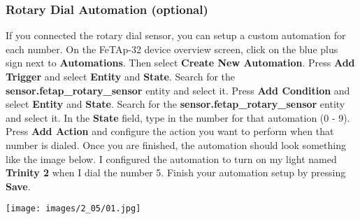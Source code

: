 \documentclass[]{article}
\begin{document}
\subsubsection{Rotary Dial Automation (optional)}
If you connected the rotary dial sensor, you can setup a custom automation for each number. On the FeTAp-32 device overview screen, click on the blue plus sign next to \textbf{Automations}.
\newline
\newline
Then select \textbf{Create New Automation}.
\newline
\newline
Press \textbf{Add Trigger} and select \textbf{Entity} and \textbf{State}. Search for the \textbf{sensor.fetap\_rotary\_sensor} entity and select it.
\newline
\newline
Press \textbf{Add Condition} and select \textbf{Entity} and \textbf{State}. Search for the \textbf{sensor.fetap\_rotary\_sensor} entity and select it. In the \textbf{State} field, type in the number for that automation (0 - 9).
\newline
\newline
Press \textbf{Add Action} and configure the action you want to perform when that number is dialed. Once you are finished, the automation should look something like the image below. I configured the automation to turn on my light named \textbf{Trinity 2} when I dial the number 5. Finish your automation setup by pressing \textbf{Save}.

\texttt{[image: images/2\_05/01.jpg]}
\end{document}
